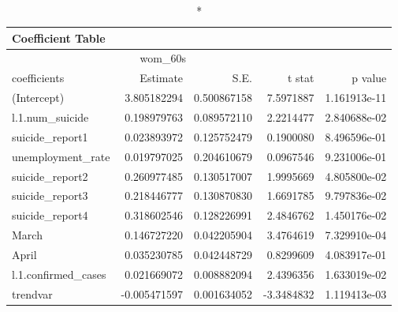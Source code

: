 \begin{longtable}{lrrrr}
\caption*{
{\large Coefficient Table}
} \\ 
\toprule
\multicolumn{4}{c}{wom\_60s} &  \\ 
\cmidrule(lr){1-4}
coefficients & Estimate & S.E. & t stat & p value \\ 
\midrule\addlinespace[2.5pt]
(Intercept) & 3.805182294 & 0.500867158 & 7.5971887 & 1.161913e-11 \\ 
l.1.num\_suicide & 0.198979763 & 0.089572110 & 2.2214477 & 2.840688e-02 \\ 
suicide\_report1 & 0.023893972 & 0.125752479 & 0.1900080 & 8.496596e-01 \\ 
unemployment\_rate & 0.019797025 & 0.204610679 & 0.0967546 & 9.231006e-01 \\ 
suicide\_report2 & 0.260977485 & 0.130517007 & 1.9995669 & 4.805800e-02 \\ 
suicide\_report3 & 0.218446777 & 0.130870830 & 1.6691785 & 9.797836e-02 \\ 
suicide\_report4 & 0.318602546 & 0.128226991 & 2.4846762 & 1.450176e-02 \\ 
March & 0.146727220 & 0.042205904 & 3.4764619 & 7.329910e-04 \\ 
April & 0.035230785 & 0.042448729 & 0.8299609 & 4.083917e-01 \\ 
l.1.confirmed\_cases & 0.021669072 & 0.008882094 & 2.4396356 & 1.633019e-02 \\ 
trendvar & -0.005471597 & 0.001634052 & -3.3484832 & 1.119413e-03 \\ 
\bottomrule
\end{longtable}

